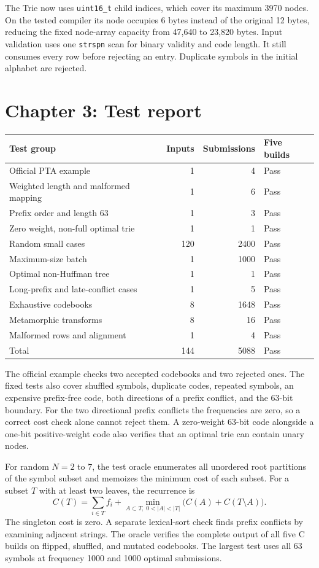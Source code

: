 \documentclass[11pt,a4paper]{article}
\begin{document}
The Trie now uses \texttt{uint16\_t} child indices, which cover its maximum 3970 nodes. On the tested compiler its node occupies 6 bytes instead of the original 12 bytes, reducing the fixed node-array capacity from 47,640 to 23,820 bytes. Input validation uses one \texttt{strspn} scan for binary validity and code length. It still consumes every row before rejecting an entry. Duplicate symbols in the initial alphabet are rejected.

\section{Chapter 3: Test report}
\begin{tabular}{@{}p{.35\linewidth}rrl@{}}
\toprule
Test group & Inputs & Submissions & Five builds \\
\midrule
Official PTA example & 1 & 4 & Pass \\
Weighted length and malformed mapping & 1 & 6 & Pass \\
Prefix order and length 63 & 1 & 3 & Pass \\
Zero weight, non-full optimal trie & 1 & 1 & Pass \\
Random small cases & 120 & 2400 & Pass \\
Maximum-size batch & 1 & 1000 & Pass \\
Optimal non-Huffman tree & 1 & 1 & Pass \\
Long-prefix and late-conflict cases & 1 & 5 & Pass \\
Exhaustive codebooks & 8 & 1648 & Pass \\
Metamorphic transforms & 8 & 16 & Pass \\
Malformed rows and alignment & 1 & 4 & Pass \\
\midrule
Total & 144 & 5088 & Pass \\
\bottomrule
\end{tabular}

The official example checks two accepted codebooks and two rejected ones. The fixed tests also cover shuffled symbols, duplicate codes, repeated symbols, an expensive prefix-free code, both directions of a prefix conflict, and the 63-bit boundary. For the two directional prefix conflicts the frequencies are zero, so a correct cost check alone cannot reject them. A zero-weight 63-bit code alongside a one-bit positive-weight code also verifies that an optimal trie can contain unary nodes.

For random $N=2$ to $7$, the test oracle enumerates all unordered root partitions of the symbol subset and memoizes the minimum cost of each subset. For a subset $T$ with at least two leaves, the recurrence is
\[
C(T)=\sum_{i\in T}f_i + \min_{A\subset T,\;0<|A|<|T|}
\bigl(C(A)+C(T\setminus A)\bigr).
\]
The singleton cost is zero. A separate lexical-sort check finds prefix conflicts by examining adjacent strings. The oracle verifies the complete output of all five C builds on flipped, shuffled, and mutated codebooks. The largest test uses all 63 symbols at frequency 1000 and 1000 optimal submissions.
\end{document}
